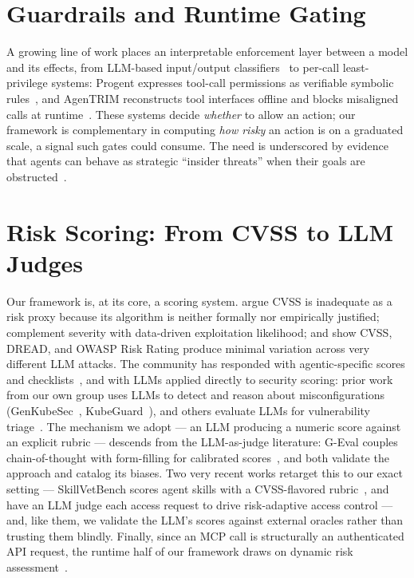 \section{Guardrails and Runtime Gating}
\label{sec:related_work:guardrails}

A growing line of work places an interpretable enforcement layer between a model
and its effects, from LLM-based input/output classifiers~\cite{inan2023llamaguard}
to per-call least-privilege systems: Progent expresses tool-call permissions as
verifiable symbolic rules~\cite{shi2025progent}, and AgenTRIM reconstructs tool
interfaces offline and blocks misaligned calls at
runtime~\cite{betser2026agentrim}. These systems decide \emph{whether} to allow
an action; our framework is complementary in computing \emph{how risky} an action
is on a graduated scale, a signal such gates could consume. The need is
underscored by evidence that agents can behave as strategic ``insider threats''
when their goals are obstructed~\cite{anthropic2025misalignment}.

\section{Risk Scoring: From CVSS to LLM Judges}
\label{sec:related_work:scoring}

Our framework is, at its core, a scoring system. \citet{spring2021time} argue
CVSS is inadequate as a risk proxy because its algorithm is neither formally nor
empirically justified; \citet{jacobs2021epss} complement severity with
data-driven exploitation likelihood; and \citet{bahar2024validity} show CVSS,
DREAD, and OWASP Risk Rating produce minimal variation across very different LLM
attacks. The community has responded with agentic-specific scores and
checklists~\cite{owasp2025aivss,mehra2025graphofeffort,owasp2026agentictop10},
and with LLMs applied directly to security scoring: prior work from our own group
uses LLMs to detect and reason about misconfigurations
(GenKubeSec~\cite{malul2024genkubesec}, KubeGuard~\cite{cohen2025kubeguard}), and
others evaluate LLMs for vulnerability triage~\cite{haddad2025prompting}. The
mechanism we adopt --- an LLM producing a numeric score against an explicit
rubric --- descends from the LLM-as-judge literature: G-Eval couples
chain-of-thought with form-filling for calibrated scores~\cite{liu2023geval},
and \citet{zheng2023judging} both validate the approach and catalog its biases.
Two very recent works retarget this to our exact setting --- SkillVetBench scores
agent skills with a CVSS-flavored rubric~\cite{hossain2026skillvet}, and
\citet{fleming2025tbac} have an LLM judge each access request to drive
risk-adaptive access control --- and, like them, we validate the LLM's scores
against external oracles rather than trusting them blindly. Finally, since an MCP
call is structurally an authenticated API request, the runtime half of our
framework draws on dynamic risk assessment~\cite{cheimonidis2023dynamic}.

